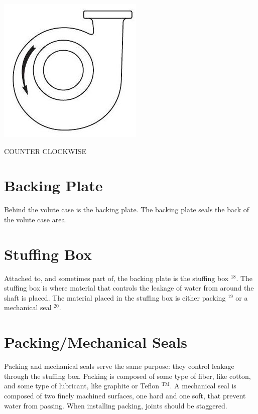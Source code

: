 \documentclass[10pt]{article}
\begin{document}
\includegraphics[max width=\textwidth]{2022_11_03_65aa625ded296bdfd01fg-07(1)}

COUNTER CLOCKWISE

\section{Backing Plate}
Behind the volute case is the backing plate. The backing plate seals the back of the volute case area.

\section{Stuffing Box}
Attached to, and sometimes part of, the backing plate is the stuffing box ${ }^{18}$. The stuffing box is where material that controls the leakage of water from around the shaft is placed. The material placed in the stuffing box is either packing ${ }^{19}$ or a mechanical seal $^{20}$.

\section{Packing/Mechanical Seals}
Packing and mechanical seals serve the same purpose: they control leakage through the stuffing box. Packing is composed of some type of fiber, like cotton, and some type of lubricant, like graphite or Teflon ${ }^{\mathrm{TM}}$. A mechanical seal is composed of two finely machined surfaces, one hard and one soft, that prevent water from passing. When installing packing, joints should be staggered.
\end{document}
